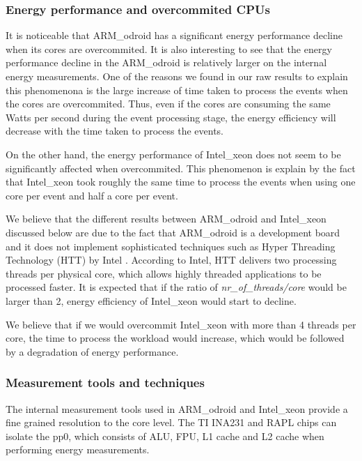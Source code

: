 \subsubsection*{Energy performance and overcommited CPUs}

It is noticeable that ARM\_odroid has a significant energy performance decline when its cores are overcommited. It is also interesting to see that the energy performance decline in the ARM\_odroid is relatively larger on the internal energy measurements. One of the reasons we found in our raw results to explain this phenomenona is the large increase of time taken to process the events when the cores are overcommited. Thus, even if the cores are consuming the same Watts per second during the event processing stage, the energy efficiency will decrease with the time taken to process the events.  

On the other hand, the energy performance of Intel\_xeon does not seem to be significantly affected when overcommited. This phenomenon is explain by the fact that Intel\_xeon took roughly the same time to process the events when using one core per event and half a core per event.

We believe that the different results between ARM\_odroid and Intel\_xeon discussed below are due to the fact that ARM\_odroid is a development board and it does not implement sophisticated techniques such as Hyper Threading Technology (HTT) by Intel \cite{HTT}. According to Intel, HTT delivers two processing threads per physical core, which allows highly threaded applications to be processed faster. It is expected that if the ratio of  \textit{nr\_of\_threads/core} would be larger than 2, energy efficiency of Intel\_xeon would start to decline.  

We believe that if we would overcommit Intel\_xeon with more than 4 threads per core, the time to process the workload would increase, which would be followed by a degradation of energy performance.

\subsubsection*{Measurement tools and techniques}

The internal measurement tools used in ARM\_odroid and Intel\_xeon provide a fine grained resolution to the core level. The TI INA231 and RAPL chips can isolate the pp0, which consists of ALU, FPU, L1 cache and L2 cache when performing energy measurements. 


